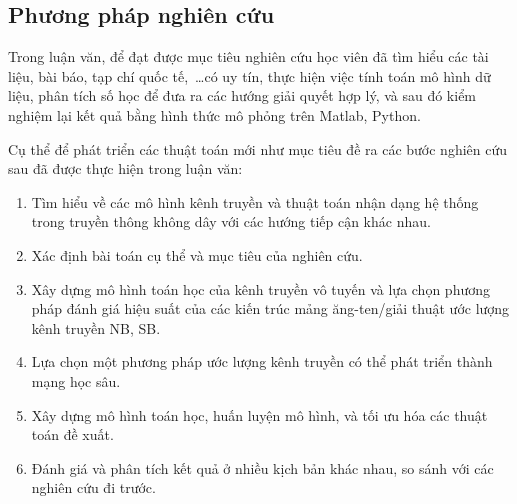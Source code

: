 \subsection*{Phương pháp nghiên cứu}

Trong luận văn, để đạt được mục tiêu nghiên cứu học viên đã tìm hiểu các tài liệu, bài báo, tạp chí quốc tế,~\ldots có uy tín, thực hiện việc tính toán mô hình dữ liệu, phân tích số học để đưa ra các hướng giải quyết hợp lý, và sau đó kiểm nghiệm lại kết quả bằng hình thức mô phỏng trên Matlab, Python.

Cụ thể để phát triển các thuật toán mới như mục tiêu đề ra các bước nghiên cứu sau đã được thực hiện trong luận văn:

\begin{enumerate}
    \item Tìm hiểu về các mô hình kênh truyền và thuật toán nhận dạng hệ thống trong truyền thông không dây với các hướng tiếp cận khác nhau. 
	\item Xác định bài toán cụ thể và mục tiêu của nghiên cứu.
    \item Xây dựng mô hình toán học của kênh truyền vô tuyến và lựa chọn phương pháp đánh giá hiệu suất của các kiến trúc mảng ăng-ten/giải thuật ước lượng kênh truyền NB, SB.
    \item Lựa chọn một phương pháp ước lượng kênh truyền có thể phát triển thành mạng học sâu.
	\item Xây dựng mô hình toán học, huấn luyện mô hình, và tối ưu hóa các thuật toán đề xuất.
	\item Đánh giá và phân tích kết quả ở nhiều kịch bản khác nhau, so sánh với các nghiên cứu đi trước.
\end{enumerate} 
\vspace{0.3cm}


